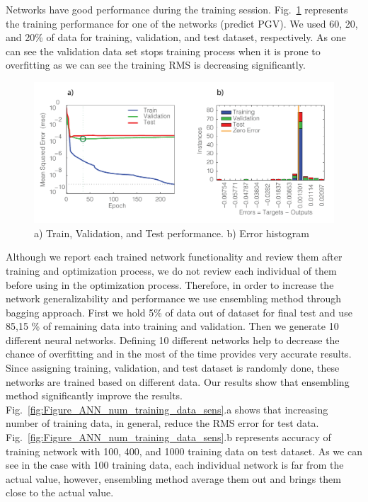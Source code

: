 Networks have good performance during the training session. Fig.~\ref{fig:Figure_training_performance} represents the training performance for one of the networks (predict PGV). We used 60, 20, and 20\% of data for training, validation, and test dataset, respectively.  As one can see the validation data set stops training process when it is prone to overfitting as we can see the training RMS is decreasing significantly. 

  \begin{figure}[ht]
    \centering
    \includegraphics[width=\textwidth]{figures/pdf/Figure_training_performance.pdf}
    \caption{a) Train, Validation, and Test performance. b) Error histogram}
    \label{fig:Figure_training_performance}
\end{figure}

Although we report each trained network functionality and review them after training and optimization process, we do not review each individual of them before using in the optimization process. Therefore, in order to increase the network generalizability and performance we use ensembling method through bagging approach. First we hold 5\% of data out of dataset for final test and use  85,15 \% of remaining data into training and validation. Then we generate 10 different neural networks. Defining 10 different networks help to decrease the chance of overfitting and in the most of the time provides very accurate results.  Since assigning training, validation, and test dataset is randomly done, these networks are trained based on different data. Our results show that ensembling method significantly improve the results. Fig.~\ref{fig:Figure_ANN_num_training_data_sens}.a shows that increasing number of training data, in general, reduce the RMS error for test data. Fig.~\ref{fig:Figure_ANN_num_training_data_sens}.b represents accuracy of training network with 100, 400, and 1000 training data on test dataset. As we can see in the case with 100 training data, each individual network is far from the actual value, however, ensembling method average them out and brings them close to the actual value. 

